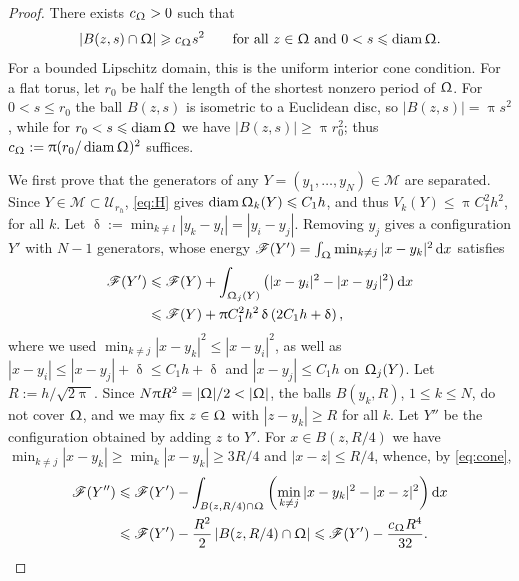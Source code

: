\documentclass[letterpaper,11pt,twoside]{article}
\numberwithin{figure}{section}
\numberwithin{table}{section}
\theoremstyle{cpamplain}
\theoremstyle{cpamdefinition}
\newcommand{\diff}{\mathrm{d}}
\let\delta\updelta
\let\pi\uppi
\let\Omega\Upomega
\renewcommand{\le}{\leqslant}
\renewcommand{\ge}{\geqslant}
\numberwithin{equation}{section}
\begin{document}
\begin{proof}
There exists $c_\Omega>0$ such that
\begin{equation}\label{eq:cone}
|B(z,s)\cap\Omega|\ge c_\Omega s^2
\qquad\text{for all }z\in\Omega\text{ and }0<s\le\operatorname{diam}\Omega .
\end{equation}
For a bounded Lipschitz domain, this is the uniform interior cone condition.
For a flat torus, let $r_0$ be half the length of the shortest nonzero period of $\Omega$. For $0<s\le r_0$ the ball $B(z,s)$ is isometric to a Euclidean disc, so $|B(z,s)|=\pi s^2$, while for $r_0<s\le\operatorname{diam}\Omega$ we have $|B(z,s)|\ge\pi r_0^2$; thus $c_\Omega:=\pi(r_0/\operatorname{diam}\Omega)^2$ suffices.

We first prove that the generators of any $Y=(y_1,\dots,y_N)\in\mathcal M$ are separated.
Since $Y\in\mathcal M\subset\mathcal U_{r_h}$, \eqref{eq:H} gives $\operatorname{diam}\Omega_k(Y)\le C_1h$, and thus $V_k(Y)\le\pi C_1^2h^2$, for all $k$.
Let $\delta:=\min_{k\ne l}|y_k-y_l|=|y_i-y_j|$.
Removing $y_j$ gives a configuration $Y'$ with $N-1$ generators, whose energy $\mathscr F(Y')=\int_\Omega\min_{k\ne j}|x-y_k|^2\,\diff x$ satisfies
\begin{equation}\label{eq:removal}
\begin{aligned}
\mathscr F(Y')
&\le\mathscr F(Y)+\int_{\Omega_j(Y)}\left(|x-y_i|^2-|x-y_j|^2\right)\diff x\\
&\le\mathscr F(Y)+\pi C_1^2h^2\,\delta\left(2C_1h+\delta\right),
\end{aligned}
\end{equation}
where we used $\min_{k\ne j}|x-y_k|^2\le|x-y_i|^2$, as well as $|x-y_i|\le|x-y_j|+\delta\le C_1h+\delta$ and $|x-y_j|\le C_1h$ on $\Omega_j(Y)$.
Let $R:=h/\sqrt{2\pi}$. Since $N\pi R^2=|\Omega|/2<|\Omega|$, the balls $B(y_k,R)$, $1\le k\le N$, do not cover $\Omega$, and we may fix $z\in\Omega$ with $|z-y_k|\ge R$ for all $k$.
Let $Y''$ be the configuration obtained by adding $z$ to $Y'$.
For $x\in B(z,R/4)$ we have $\min_{k\ne j}|x-y_k|\ge\min_k|x-y_k|\ge3R/4$ and $|x-z|\le R/4$, whence, by \eqref{eq:cone},
\begin{equation}\label{eq:insertion}
\begin{aligned}
\mathscr F(Y'')
&\le\mathscr F(Y')-\int_{B(z,R/4)\cap\Omega}\left(\min_{k\ne j}|x-y_k|^2-|x-z|^2\right)\diff x\\
&\le\mathscr F(Y')-\frac{R^2}{2}\,|B(z,R/4)\cap\Omega|
\le\mathscr F(Y')-\frac{c_\Omega R^4}{32} .
\end{aligned}

\end{equation}
\end{proof}
\end{document}
